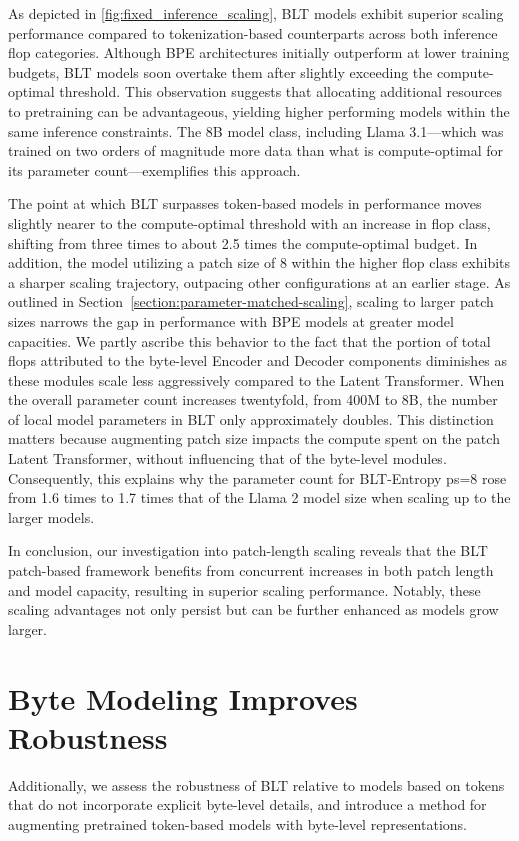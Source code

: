 As depicted in \autoref{fig:fixed_inference_scaling}, {\textsc BLT} models exhibit superior scaling performance compared to tokenization-based counterparts across both inference flop categories. Although BPE architectures initially outperform at lower training budgets, {\textsc BLT} models soon overtake them after slightly exceeding the compute-optimal threshold. This observation suggests that allocating additional resources to pretraining can be advantageous, yielding higher performing models within the same inference constraints. The 8B model class, including Llama 3.1—which was trained on two orders of magnitude more data than what is compute-optimal for its parameter count—exemplifies this approach.

The point at which {\textsc BLT} surpasses token-based models in performance moves slightly nearer to the compute-optimal threshold with an increase in flop class, shifting from three times to about 2.5 times the compute-optimal budget. In addition, the model utilizing a patch size of 8 within the higher flop class exhibits a sharper scaling trajectory, outpacing other configurations at an earlier stage. As outlined in Section~\ref{section:parameter-matched-scaling}, scaling to larger patch sizes narrows the gap in performance with BPE models at greater model capacities. We partly ascribe this behavior to the fact that the portion of total flops attributed to the byte-level Encoder and Decoder components diminishes as these modules scale less aggressively compared to the Latent Transformer. When the overall parameter count increases twentyfold, from 400M to 8B, the number of local model parameters in {\textsc BLT} only approximately doubles. This distinction matters because augmenting patch size impacts the compute spent on the patch Latent Transformer, without influencing that of the byte-level modules. Consequently, this explains why the parameter count for {\textsc BLT}-Entropy ps=8 rose from 1.6 times to 1.7 times that of the Llama 2 model size when scaling up to the larger models.

In conclusion, our investigation into patch-length scaling reveals that the {\textsc BLT} patch-based framework benefits from concurrent increases in both patch length and model capacity, resulting in superior scaling performance. Notably, these scaling advantages not only persist but can be further enhanced as models grow larger.

\section{Byte Modeling Improves Robustness} Additionally, we assess the robustness of {\textsc BLT} relative to models based on tokens that do not incorporate explicit byte-level details, and introduce a method for augmenting pretrained token-based models with byte-level representations.
\label{sec:robustness}


